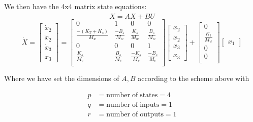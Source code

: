\begin{Example}
We then have the 4x4 matrix state equations:
\[
\dot{X} = AX+BU
\]
\[
\dot{X} = \begin{bmatrix}\dot{x}_2 \\ \ddot{x}_2 \\ \dot{x}_3 \\ \ddot{x}_3\end{bmatrix}
=
\begin{bmatrix} 0&1&0&0\\
\frac{-(K_T+K_s)}{M_w}&\frac{-B_s}{M_w}&\frac{K_s}{M_w}&\frac{B_s}{M_w}\\
0&0&0&1 \\
\frac{K_s}{M_v}&\frac{B_s}{M_v}&\frac{-K_s}{M_v}&\frac{-B_s}{M_v}\\
\end{bmatrix}
\begin{bmatrix}x_2\\\dot{x}_2\\x_3\\\dot{x}_3 \end{bmatrix}+
\begin{bmatrix}
    0\\
    \frac{K_t}{M_w}\\
    0\\
    0\\
\end{bmatrix}
\begin{bmatrix}x_1\end{bmatrix}
\]

Where we have set the dimensions of $A,B$ according to the scheme above with

\[
\begin{aligned}
    p &= \mathrm{number\; of\; states} = 4\\
    q &= \mathrm{number\; of\; inputs} = 1\\
    r &= \mathrm{number\; of\; outputs} = 1 \\
\end{aligned}
\]

\end{Example}


